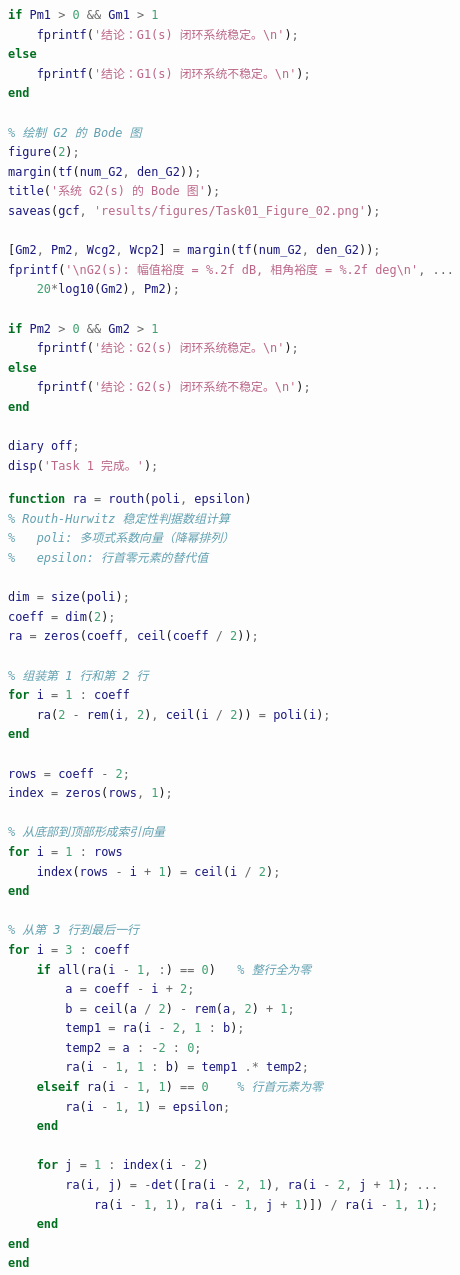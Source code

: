 \documentclass{../common/SCNU_Experimental_Report}
\begin{document}
\begin{lstlisting}[language=Matlab]
if Pm1 > 0 && Gm1 > 1
    fprintf('结论：G1(s) 闭环系统稳定。\n');
else
    fprintf('结论：G1(s) 闭环系统不稳定。\n');
end

% 绘制 G2 的 Bode 图
figure(2);
margin(tf(num_G2, den_G2));
title('系统 G2(s) 的 Bode 图');
saveas(gcf, 'results/figures/Task01_Figure_02.png');

[Gm2, Pm2, Wcg2, Wcp2] = margin(tf(num_G2, den_G2));
fprintf('\nG2(s): 幅值裕度 = %.2f dB, 相角裕度 = %.2f deg\n', ...
    20*log10(Gm2), Pm2);

if Pm2 > 0 && Gm2 > 1
    fprintf('结论：G2(s) 闭环系统稳定。\n');
else
    fprintf('结论：G2(s) 闭环系统不稳定。\n');
end

diary off;
disp('Task 1 完成。');
\end{lstlisting}

\begin{lstlisting}[language=Matlab, caption={Routh判据辅助函数}]
function ra = routh(poli, epsilon)
% Routh-Hurwitz 稳定性判据数组计算
%   poli: 多项式系数向量（降幂排列）
%   epsilon: 行首零元素的替代值

dim = size(poli);
coeff = dim(2);
ra = zeros(coeff, ceil(coeff / 2));

% 组装第 1 行和第 2 行
for i = 1 : coeff
    ra(2 - rem(i, 2), ceil(i / 2)) = poli(i);
end

rows = coeff - 2;
index = zeros(rows, 1);

% 从底部到顶部形成索引向量
for i = 1 : rows
    index(rows - i + 1) = ceil(i / 2);
end

% 从第 3 行到最后一行
for i = 3 : coeff
    if all(ra(i - 1, :) == 0)   % 整行全为零
        a = coeff - i + 2;
        b = ceil(a / 2) - rem(a, 2) + 1;
        temp1 = ra(i - 2, 1 : b);
        temp2 = a : -2 : 0;
        ra(i - 1, 1 : b) = temp1 .* temp2;
    elseif ra(i - 1, 1) == 0    % 行首元素为零
        ra(i - 1, 1) = epsilon;
    end

    for j = 1 : index(i - 2)
        ra(i, j) = -det([ra(i - 2, 1), ra(i - 2, j + 1); ...
            ra(i - 1, 1), ra(i - 1, j + 1)]) / ra(i - 1, 1);
    end
end
end
\end{lstlisting}
\end{document}
